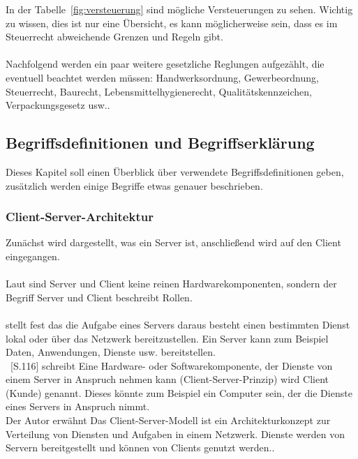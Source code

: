 In der Tabelle~\ref{fig:versteuerung} sind mögliche Versteuerungen zu sehen. Wichtig zu wissen, dies ist nur eine Übersicht, es kann möglicherweise sein, dass es im Steuerrecht abweichende Grenzen und Regeln gibt.
\\
\\
Nachfolgend werden ein paar weitere gesetzliche Reglungen aufgezählt, die eventuell beachtet werden müssen: Handwerksordnung, Gewerbeordnung, Steuerrecht, Baurecht, Lebensmittelhygienerecht, Qualitätskennzeichen, Verpackungsgesetz usw..


\subsection{Begriffsdefinitionen und Begriffserklärung}\label{begriffsdefinitionen}
Dieses Kapitel soll einen Überblick über verwendete Begriffsdefinitionen geben, zusätzlich werden einige Begriffe etwas genauer beschrieben.

\subsubsection{Client-Server-Architektur}\label{client-Server-Architektur}

Zunächst wird dargestellt, was ein Server ist, anschließend wird auf den Client eingegangen.
\\
\\
Laut \cite{clientServerModel} sind Server und Client keine reinen Hardwarekomponenten, sondern der Begriff \glqq Server und Client\grqq{} beschreibt Rollen.
\\
\\
\cite{clientServerModel} stellt fest das die Aufgabe eines Servers daraus besteht \glqq einen bestimmten Dienst lokal oder über das Netzwerk bereitzustellen.\grqq{}
Ein Server kann zum Beispiel Daten, Anwendungen, Dienste usw. bereitstellen. 
\\
\cite{win08}~[S.116] schreibt \glqq Eine Hardware- oder Softwarekomponente, der Dienste von einem Server in Anspruch nehmen kann (Client-Server-Prinzip) wird Client (Kunde) genannt.\grqq{} Dieses könnte zum Beispiel ein Computer sein, der die Dienste eines Servers in Anspruch nimmt. 
\\
Der Autor \cite{clientServerModel} erwähnt \glqq Das Client-Server-Modell ist ein Architekturkonzept zur Verteilung von Diensten und Aufgaben in einem Netzwerk. Dienste werden von Servern bereitgestellt und können von Clients genutzt werden.\grqq{}.

